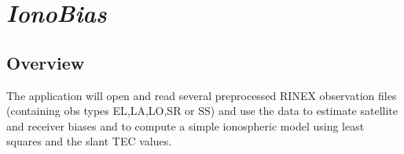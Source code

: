 %
%


\section{\emph{IonoBias}}
\subsection{Overview}
The application will open and read several preprocessed RINEX observation files (containing obs types EL,LA,LO,SR or SS) and use the data to estimate satellite and receiver biases and to compute a simple ionospheric model using least squares and the slant TEC values.

